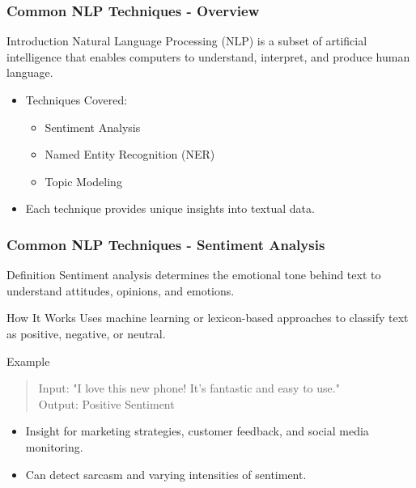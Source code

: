 \documentclass[aspectratio=169]{beamer}
\begin{document}
\begin{frame}[fragile]
    \frametitle{Common NLP Techniques - Overview}
    \begin{block}{Introduction}
        Natural Language Processing (NLP) is a subset of artificial intelligence that enables computers to understand, interpret, and produce human language.
    \end{block}

    \begin{itemize}
        \item Techniques Covered:
        \begin{itemize}
            \item Sentiment Analysis
            \item Named Entity Recognition (NER)
            \item Topic Modeling
        \end{itemize}
        \item Each technique provides unique insights into textual data.
    \end{itemize}
\end{frame}

\begin{frame}[fragile]
    \frametitle{Common NLP Techniques - Sentiment Analysis}
    
    \begin{block}{Definition}
        Sentiment analysis determines the emotional tone behind text to understand attitudes, opinions, and emotions.
    \end{block}
    
    \begin{block}{How It Works}
        Uses machine learning or lexicon-based approaches to classify text as positive, negative, or neutral.
    \end{block}
    
    \begin{block}{Example}
        \begin{quote}
            Input: "I love this new phone! It's fantastic and easy to use." \\
            Output: Positive Sentiment
        \end{quote}
    \end{block}
    
    \begin{itemize}
        \item Insight for marketing strategies, customer feedback, and social media monitoring.
        \item Can detect sarcasm and varying intensities of sentiment.
    \end{itemize}
\end{frame}
\end{document}
